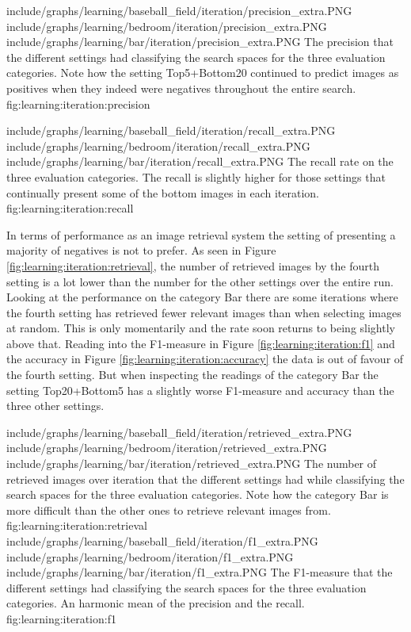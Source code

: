 \tripfigurenear
{include/graphs/learning/baseball_field/iteration/precision_extra.PNG}
{include/graphs/learning/bedroom/iteration/precision_extra.PNG}
{include/graphs/learning/bar/iteration/precision_extra.PNG}
{The precision that the different settings had classifying the search spaces for the three evaluation categories. Note how the setting Top5+Bottom20 continued to predict images as positives when they indeed were negatives throughout the entire search.}
{fig:learning:iteration:precision}

\tripfigurenear
{include/graphs/learning/baseball_field/iteration/recall_extra.PNG}
{include/graphs/learning/bedroom/iteration/recall_extra.PNG}
{include/graphs/learning/bar/iteration/recall_extra.PNG}
{The recall rate on the three evaluation categories. The recall is slightly higher for those settings that continually present some of the bottom images in each iteration.}
{fig:learning:iteration:recall}

In terms of performance as an image retrieval system the setting of presenting a majority of negatives is not to prefer. As seen in Figure \ref{fig:learning:iteration:retrieval}, the number of retrieved images by the fourth setting is a lot lower than the number for the other settings over the entire run. Looking at the performance on the category Bar there are some iterations where the fourth setting has retrieved fewer relevant images than when selecting images at random. This is only momentarily and the rate soon returns to being slightly above that. Reading into the F1-measure in Figure \ref{fig:learning:iteration:f1} and the accuracy in Figure \ref{fig:learning:iteration:accuracy} the data is out of favour of the fourth setting. But when inspecting the readings of the category Bar the setting Top20+Bottom5 has a slightly worse F1-measure and accuracy than the three other settings. 

\tripfigurenear
{include/graphs/learning/baseball_field/iteration/retrieved_extra.PNG}
{include/graphs/learning/bedroom/iteration/retrieved_extra.PNG}
{include/graphs/learning/bar/iteration/retrieved_extra.PNG}
{The number of retrieved images over iteration that the different settings had while classifying the search spaces for the three evaluation categories. Note how the category Bar is more difficult than the other ones to retrieve relevant images from.}
{fig:learning:iteration:retrieval}
\tripfigurenear
{include/graphs/learning/baseball_field/iteration/f1_extra.PNG}
{include/graphs/learning/bedroom/iteration/f1_extra.PNG}
{include/graphs/learning/bar/iteration/f1_extra.PNG}
{The F1-measure that the different settings had classifying the search spaces for the three evaluation categories. An harmonic mean of the precision and the recall.}
{fig:learning:iteration:f1}



